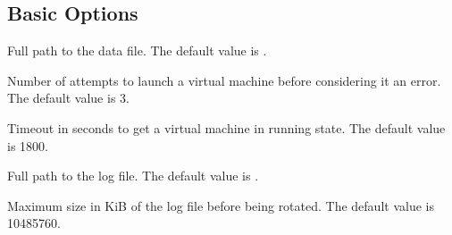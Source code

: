 \documentclass[letterpaper,10pt,english]{sphinxmanual}
\begin{document}
\subsection{Basic Options}
\label{manual:basic-options}

\begin{fulllineitems}
\label{manual:confval-DATA_FILE}
Full path to the data file.
The default value is .

\end{fulllineitems}


\begin{fulllineitems}
\label{manual:confval-MAX_VM_FAILS}
Number of attempts to launch a virtual machine before considering it
an error.
The default value is 3.

\end{fulllineitems}


\begin{fulllineitems}
\label{manual:confval-WAIT_RUNNING_VM_TIMEOUT}
Timeout in seconds to get a virtual machine in running state.
The default value is 1800.

\end{fulllineitems}


\begin{fulllineitems}
\label{manual:confval-LOG_FILE}
Full path to the log file.
The default value is .

\end{fulllineitems}


\begin{fulllineitems}
\label{manual:confval-LOG_FILE_MAX_SIZE}
Maximum size in KiB of the log file before being rotated.
The default value is 10485760.

\end{fulllineitems}
\end{document}
